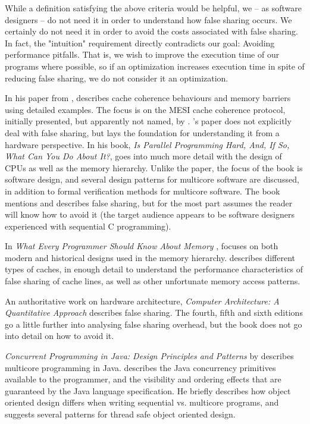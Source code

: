 While a definition satisfying the above criteria would be helpful, we -- as
software designers -- do not need it in order to understand how false sharing
occurs. We certainly do not need it in order to avoid the costs associated with
false sharing. In fact, the "intuition" requirement directly contradicts our
goal: Avoiding performance pitfalls. That is, we wish to improve the execution
time of our programs where possible, so if an optimization increases execution
time in spite of reducing false sharing, we do not consider it an optimization.


In his paper from \citeyear{mckenny-barriers} \cite{mckenny-barriers}, \citeauthor{mckenny-barriers}
describes cache coherence behaviours and memory barriers using detailed
examples. The focus is on the MESI cache coherence protocol, initially
presented, but apparently not named, by \citeauthor{mesi} \cite{mesi}.
\citeauthor{mckenny-barriers}'s paper
does not explicitly deal with false sharing, but lays the foundation for
understanding it from a hardware perspective. In his book, \textit{Is Parallel
Programming Hard, And, If So, What Can You Do About It?}\cite{mckenney},
\citeauthor{mckenney} goes into much more detail with the design of CPUs as well
as the memory hierarchy. Unlike the \citeyear{mckenny-barriers} paper, the
focus of the book is software design, and several design patterns for multicore
software are discussed, in addition to formal verification methods for multicore
software. The book mentions and describes false sharing, but for the most part
assumes the reader will know how to avoid it (the target audience appears to
be software designers experienced with sequential C programming).

In \textit{What Every Programmer Should Know About Memory}
\cite{whatprogrammersshouldknow}, \citeauthor{whatprogrammersshouldknow} focuses
on both modern and historical designs used in the memory hierarchy.
\citeauthor{whatprogrammersshouldknow} describes different types of caches, in
enough detail to understand the performance characteristics of false sharing of
cache lines, as well as other unfortunate memory access patterns.

An authoritative work on hardware architecture, \textit{Computer Architecture:
A Quantitative Approach} \cite{quantarch} describes false sharing. The fourth,
fifth and sixth editions go a little further into analysing false sharing
overhead, but the book does not go into detail on how to avoid it.

\textit{Concurrent Programming in Java: Design Principles and Patterns} by
\citeauthor{lea} describes multicore programming in Java. \citeauthor{lea}
describes the Java concurrency primitives available to the programmer, and the
visibility and ordering effects that are guaranteed by the Java language
specification. He briefly describes how object oriented design differs when
writing sequential vs. multicore programs, and suggests several patterns for
thread safe object oriented design.
